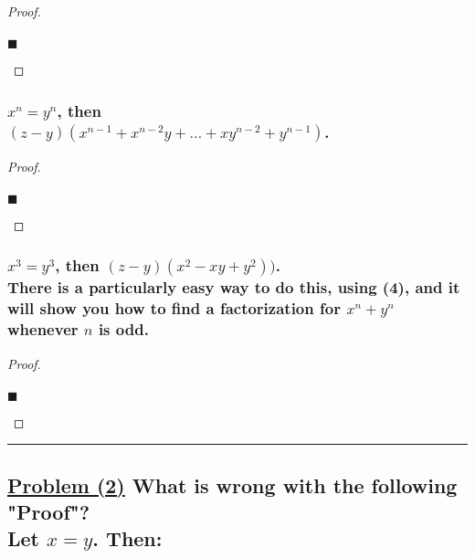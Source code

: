 \documentclass[letterpaper, 10 pt, conference]{ieeeconf}  %
\begin{document}
\begin{proof}
\begin{align}
    
\end{align}
\begin{flushright}
$\blacksquare$
\end{flushright}
\end{proof}

\begin{mdframed}
\subsubsection{\textbf{$x^n = y^n$, then \\ $(z - y)(x^{n-1} + x^{n-2}y + \dots + xy^{n-2} + y^{n-1})$.}}
\end{mdframed}

\begin{proof}
\begin{align}
    
\end{align}
\begin{flushright}
$\blacksquare$
\end{flushright}
\end{proof}

\begin{mdframed}
\subsubsection{\textbf{$x^3 = y^3$, then $(z - y)(x^2 - xy +y^2))$. \\ \small{There is a particularly easy way to do this, using (4), and it will show you how to find a factorization for $x^n + y^n$} whenever $n$ is odd.}}
\end{mdframed}

\begin{proof}
\begin{align}
    
\end{align}
\begin{flushright}
$\blacksquare$
\end{flushright}
\end{proof}

\noindent\rule{8cm}{0.4pt}

\subsection{\textbf{\underline{Problem (2)} What is wrong with the following "Proof"? \\ Let $x = y$. Then:}}
\end{document}
